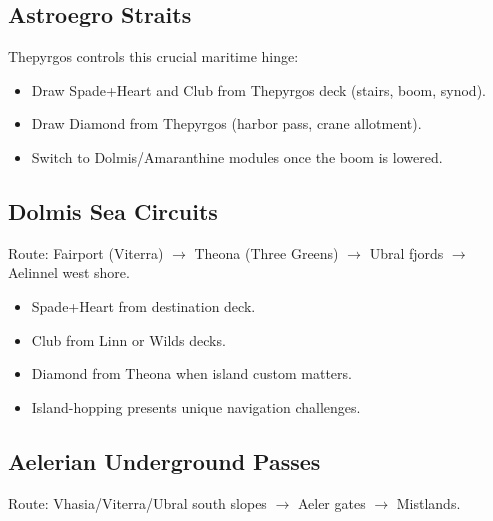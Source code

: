 \subsection{Astroegro Straits}
\label{subsec:astroegro-straits}

Thepyrgos controls this crucial maritime hinge:
\begin{itemize}
\item Draw Spade+Heart and Club from Thepyrgos deck (stairs, boom, synod).
\item Draw Diamond from Thepyrgos (harbor pass, crane allotment).
\item Switch to Dolmis/Amaranthine modules once the boom is lowered.
\end{itemize}

\subsection{Dolmis Sea Circuits}
\label{subsec:dolmis-circuits}

Route: Fairport (Viterra) $\rightarrow$ Theona (Three Greens) $\rightarrow$ Ubral fjords $\rightarrow$ Aelinnel west shore.

\begin{itemize}
\item Spade+Heart from destination deck.
\item Club from Linn or Wilds decks.
\item Diamond from Theona when island custom matters.
\item Island-hopping presents unique navigation challenges.
\end{itemize}

\subsection{Aelerian Underground Passes}
\label{subsec:aelerian-passes}

Route: Vhasia/Viterra/Ubral south slopes $\rightarrow$ Aeler gates $\rightarrow$ Mistlands.

